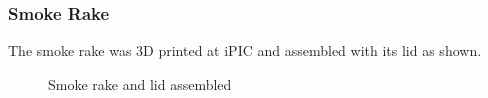 \subsubsection{Smoke Rake}
The smoke rake was 3D printed at iPIC and assembled with its lid as shown.
\begin{figure}[!htb]%
	\centering
	\qquad
	\caption[3D Printed rake]{Smoke rake and lid assembled}%
	\label{fig:result}%
\end{figure}

